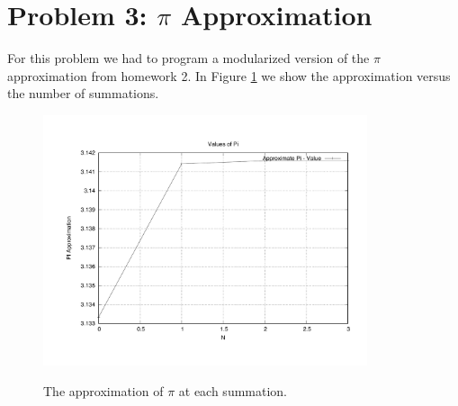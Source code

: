 \documentclass[12pt]{article}
\begin{document}
\section*{{\large Problem 3: $\pi$  Approximation}}

For this problem we had to program a modularized version of the $\pi$ approximation from homework 2. In Figure \ref{fig:pi} we show the approximation versus the number of summations.
			\begin{figure}[h]
				\caption{The approximation of $\pi$ at each summation.}
				\centering
				\includegraphics[width=0.85\textwidth]{./prob3/plots/pi_value.pdf}
				\label{fig:pi}
			\end{figure}
\end{document}
